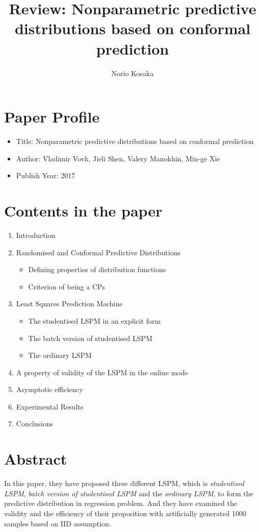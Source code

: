 \documentclass[10pt,a4paper]{article}
\author{Norio Kosaka}
\title{Review: Nonparametric predictive distributions based on conformal prediction}
\begin{document}
\maketitle

\section{Paper Profile}
\begin{itemize}
\item Title: Nonparametric predictive distributions based on conformal
prediction
\item Author: Vladimir Vovk, Jieli Shen, Valery Manokhin, Min-ge Xie
\item Publish Year: 2017
\end{itemize}

\section{Contents in the paper}
\begin{enumerate}
\item Introduction
\item Randomised and Conformal Predictive Distributions
\begin{itemize}
    \item Defining properties of distribution functions
    \item Criterion of being a CPs
\end{itemize}
\item Least Squares Prediction Machine
\begin{itemize}
    \item The studentised LSPM in an explicit form
    \item The batch version of studentised LSPM
    \item The ordinary LSPM
\end{itemize}
\item A property of validity of the LSPM in the online mode
\item Asymptotic efficiency
\item Experimental Results
\item Conclusions
\end{enumerate}

\section{Abstract}
In this paper, they have proposed three different LSPM, which is \textit{studentised LSPM}, \textit{batch version of studentised LSPM} and the \textit{ordinary LSPM}, to form the predictive distribution in regression problem. And they have examined the validity and the efficiency of their proposition with artificially generated 1000 samples based on IID assumption.
\end{document}
